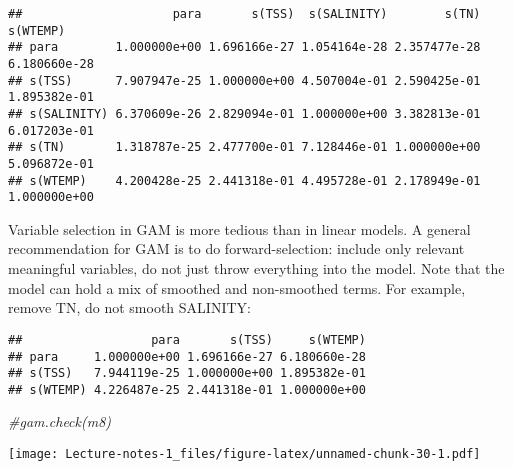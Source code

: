 \documentclass[
]{book}
\newenvironment{Shaded}{\begin{snugshade}}{\end{snugshade}}
\newcommand{\CommentTok}[1]{\textcolor[rgb]{0.56,0.35,0.01}{\textit{#1}}}
\newcommand{\DataTypeTok}[1]{\textcolor[rgb]{0.13,0.29,0.53}{#1}}
\newcommand{\DecValTok}[1]{\textcolor[rgb]{0.00,0.00,0.81}{#1}}
\newcommand{\KeywordTok}[1]{\textcolor[rgb]{0.13,0.29,0.53}{\textbf{#1}}}
\newcommand{\NormalTok}[1]{#1}
\newcommand{\OperatorTok}[1]{\textcolor[rgb]{0.81,0.36,0.00}{\textbf{#1}}}
\newcommand{\OtherTok}[1]{\textcolor[rgb]{0.56,0.35,0.01}{#1}}
\newcommand{\StringTok}[1]{\textcolor[rgb]{0.31,0.60,0.02}{#1}}
\begin{document}
\begin{verbatim}
##                     para       s(TSS)  s(SALINITY)        s(TN)     s(WTEMP)
## para        1.000000e+00 1.696166e-27 1.054164e-28 2.357477e-28 6.180660e-28
## s(TSS)      7.907947e-25 1.000000e+00 4.507004e-01 2.590425e-01 1.895382e-01
## s(SALINITY) 6.370609e-26 2.829094e-01 1.000000e+00 3.382813e-01 6.017203e-01
## s(TN)       1.318787e-25 2.477700e-01 7.128446e-01 1.000000e+00 5.096872e-01
## s(WTEMP)    4.200428e-25 2.441318e-01 4.495728e-01 2.178949e-01 1.000000e+00
\end{verbatim}

Variable selection in GAM is more tedious than in linear models. A general recommendation for GAM is to do forward-selection: include only relevant meaningful variables, do not just throw everything into the model. Note that the model can hold a mix of smoothed and non-smoothed terms. For example, remove TN, do not smooth SALINITY:

\begin{Shaded}
\end{Shaded}

\begin{verbatim}
##                  para       s(TSS)     s(WTEMP)
## para     1.000000e+00 1.696166e-27 6.180660e-28
## s(TSS)   7.944119e-25 1.000000e+00 1.895382e-01
## s(WTEMP) 4.226487e-25 2.441318e-01 1.000000e+00
\end{verbatim}

\begin{Shaded}
\begin{Highlighting}[]
\CommentTok{#gam.check(m8)}
\end{Highlighting}
\end{Shaded}

\texttt{[image: Lecture-notes-1\_files/figure-latex/unnamed-chunk-30-1.pdf]}

  
\end{document}
